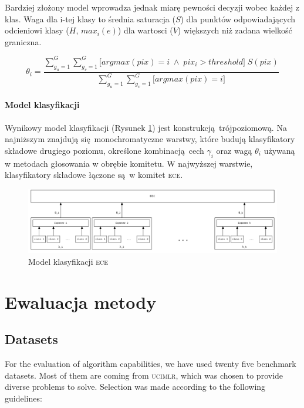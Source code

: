 \documentclass[]{article}
\begin{document}
Bardziej złożony model wprowadza jednak miarę pewności decyzji wobec każdej z klas. Waga dla i-tej klasy to średnia saturacja ($S$) dla punktów odpowiadających odcieniowi klasy ($H$, $max_i(e)$) dla wartosci ($V$) większych niż zadana wielkość graniczna. 

\begin{equation}
	\theta _i = \frac{\sum_{g_u=1}^{G}\sum_{g_v=1}^{G}\Big[ argmax(pix) = i \;\wedge\; pix_i > threshold\Big]\;S(pix)}{\sum_{g_u=1}^{G}\sum_{g_v=1}^{G} \Big[ argmax(pix) = i\Big]} 
\end{equation}

\paragraph{Model klasyfikacji}

Wynikowy model klasyfikacji (Rysunek \ref{fig:model}) jest konstrukcją trójpoziomową. Na najniższym znajdują się monochromatyczne warstwy, które budują klasyfikatory składowe drugiego poziomu, określone kombinacją cech $\gamma_i$ oraz wagą $\theta_i$ używaną w metodach głosowania w obrębie komitetu. W najwyższej warstwie, klasyfikatory składowe łączone są w komitet \textsc{ece}.

\begin{figure}[hbt]
	\center
  \includegraphics[width=\textwidth]{figures/ece_model}
  
  \caption{Model klasyfikacji \textsc{ece}}
	\label{fig:model}
\end{figure}

\section{Ewaluacja metody}

\subsection{Datasets}

For the evaluation of algorithm capabilities, we have used twenty five benchmark datasets. 
Most of them are coming from \textsc{ucimlr}\cite{asuncion2007uci}, which was chosen to provide diverse problems to solve. Selection was made according to the following guidelines: 
\end{document}
